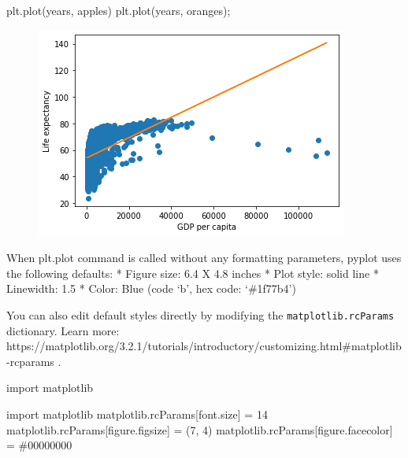 \documentclass[
  letterpaper,
  DIV=11,
  numbers=noendperiod]{scrreprt}
\newenvironment{Shaded}{\begin{snugshade}}{\end{snugshade}}
\newcommand{\DecValTok}[1]{\textcolor[rgb]{0.68,0.00,0.00}{#1}}
\newcommand{\ImportTok}[1]{\textcolor[rgb]{0.00,0.46,0.62}{#1}}
\newcommand{\NormalTok}[1]{\textcolor[rgb]{0.00,0.23,0.31}{#1}}
\newcommand{\OperatorTok}[1]{\textcolor[rgb]{0.37,0.37,0.37}{#1}}
\newcommand{\StringTok}[1]{\textcolor[rgb]{0.13,0.47,0.30}{#1}}
\begin{document}
\begin{Shaded}
\begin{Highlighting}[]
\NormalTok{plt.plot(years, apples)}
\NormalTok{plt.plot(years, oranges)}\OperatorTok{;}
\end{Highlighting}
\end{Shaded}

\begin{figure}[H]

{\centering \includegraphics{Data visualization_files/figure-pdf/cell-10-output-1.png}

}

\end{figure}

When plt.plot command is called without any formatting parameters,
pyplot uses the following defaults: * Figure size: 6.4 X 4.8 inches *
Plot style: solid line * Linewidth: 1.5 * Color: Blue (code `b', hex
code: `\#1f77b4')

You can also edit default styles directly by modifying the
\texttt{matplotlib.rcParams} dictionary. Learn more:
https://matplotlib.org/3.2.1/tutorials/introductory/customizing.html\#matplotlib-rcparams
.

\begin{Shaded}
\begin{Highlighting}[]
\ImportTok{import}\NormalTok{ matplotlib}
\end{Highlighting}
\end{Shaded}

\begin{Shaded}
\begin{Highlighting}[]
\ImportTok{import}\NormalTok{ matplotlib}
\NormalTok{matplotlib.rcParams[}\StringTok{\textquotesingle{}font.size\textquotesingle{}}\NormalTok{] }\OperatorTok{=} \DecValTok{14}
\NormalTok{matplotlib.rcParams[}\StringTok{\textquotesingle{}figure.figsize\textquotesingle{}}\NormalTok{] }\OperatorTok{=}\NormalTok{ (}\DecValTok{7}\NormalTok{, }\DecValTok{4}\NormalTok{)}
\NormalTok{matplotlib.rcParams[}\StringTok{\textquotesingle{}figure.facecolor\textquotesingle{}}\NormalTok{] }\OperatorTok{=} \StringTok{\textquotesingle{}\#00000000\textquotesingle{}}
\end{Highlighting}
\end{Shaded}
\end{document}
